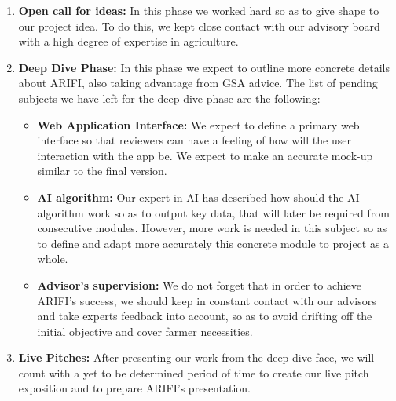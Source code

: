 \begin{enumerate}
    \item \textbf{Open call for ideas:} In this phase we worked hard so as to give shape to our project idea. To do this, we kept close contact with our advisory board with a high degree of expertise in agriculture. 
    \item \textbf{Deep Dive Phase:} In this phase we expect to outline more concrete details about ARIFI, also taking advantage from GSA advice. The list of pending subjects we have left for the deep dive phase are the following:
    \begin{itemize}
        \item \textbf{Web Application Interface:} We expect to define a primary web interface so that reviewers can have a feeling of how will the user interaction with the app be. We expect to make an accurate mock-up similar to the final version.
        \item \textbf{AI algorithm:} Our expert in AI has described how should the AI algorithm work so as to output key data, that will later be required from consecutive modules. However, more work is needed in this subject so as to define and adapt more accurately this concrete module to project as a whole.
        \item \textbf{Advisor's supervision:} We do not forget that in order to achieve ARIFI's success, we should keep in constant contact with our advisors and take experts feedback into account, so as to avoid drifting off the initial objective and cover farmer necessities.
    \end{itemize}
    \item \textbf{Live Pitches:} After presenting our work from the deep dive face, we will count with a yet to be determined period of time to create our live pitch exposition and to prepare ARIFI's presentation.\\
\end{enumerate}



